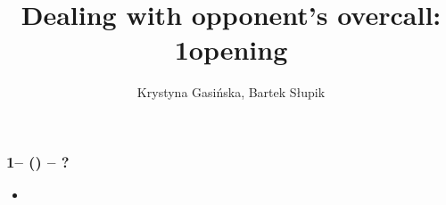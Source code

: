 \documentclass[12pt, a4paper]{article}
\title{Dealing with opponent's overcall: 1\clubs opening}
\author{Krystyna Gasińska, Bartek Słupik}
\begin{document}
\maketitle


\subsubsection*{1\clubs -- (\dbl) -- ?}
\begin{itemize}
    \item 
\end{itemize}

\end{document}
